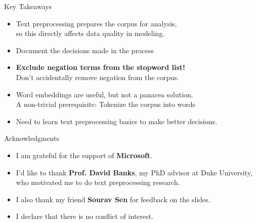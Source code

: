 \documentclass{beamer}
\renewcommand{\cite}{\citep}
\begin{document}




\begin{frame}{Key Takeaways}
\begin{itemize}
\item Text preprocessing prepares the corpus for analysis,\\
	so this directly affects data quality in modeling.
\item Document the decisions made in the process~\cite{nugent2020instead}
	\bigskip
\item \textbf{Exclude negation terms from the stopword list!}\\
	Don't accidentally remove negation from the corpus.
	\bigskip
\item Word embeddings are useful, but not a panacea solution.\\
	A non-trivial prerequisite: Tokenize the corpus into words\\
\item Need to learn text preprocessing basics to make better decisions.
\end{itemize}
\end{frame}

\begin{frame}{Acknowledgments}
\begin{itemize}
\item I am grateful for the support of \textbf{Microsoft}.
	\bigskip
\item I'd like to thank \textbf{Prof. David Banks}, my PhD advisor at Duke University, who motivated me to do text preprocessing research.
	\bigskip
\item I also thank my friend \textbf{Sourav Sen} for feedback on the slides.
	\bigskip
\item I declare that there is no conflict of interest.
\end{itemize}
\end{frame}
\end{document}
